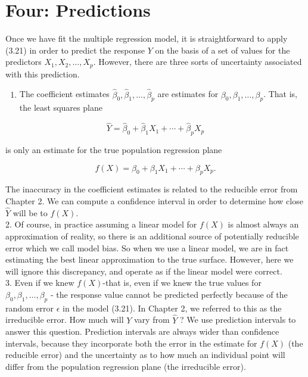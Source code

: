 \documentclass[10pt]{article}
\begin{document}
\section*{Four: Predictions}
Once we have fit the multiple regression model, it is straightforward to apply (3.21) in order to predict the response $Y$ on the basis of a set of values for the predictors $X_{1}, X_{2}, \ldots, X_{p}$. However, there are three sorts of uncertainty associated with this prediction.

\begin{enumerate}
  \item The coefficient estimates $\hat{\beta}_{0}, \hat{\beta}_{1}, \ldots, \hat{\beta}_{p}$ are estimates for $\beta_{0}, \beta_{1}, \ldots, \beta_{p}$. That is, the least squares plane
\end{enumerate}

$$
\hat{Y}=\hat{\beta}_{0}+\hat{\beta}_{1} X_{1}+\cdots+\hat{\beta}_{p} X_{p}
$$

is only an estimate for the true population regression plane

$$
f(X)=\beta_{0}+\beta_{1} X_{1}+\cdots+\beta_{p} X_{p} .
$$

The inaccuracy in the coefficient estimates is related to the reducible error from Chapter 2. We can compute a confidence interval in order to determine how close $\hat{Y}$ will be to $f(X)$.\\
2. Of course, in practice assuming a linear model for $f(X)$ is almost always an approximation of reality, so there is an additional source of potentially reducible error which we call model bias. So when we use a linear model, we are in fact estimating the best linear approximation to the true surface. However, here we will ignore this discrepancy, and operate as if the linear model were correct.\\
3. Even if we knew $f(X)$-that is, even if we knew the true values for $\beta_{0}, \beta_{1}, \ldots, \beta_{p}$ - the response value cannot be predicted perfectly because of the random error $\epsilon$ in the model (3.21). In Chapter 2, we referred to this as the irreducible error. How much will $Y$ vary from $\hat{Y}$ ? We use prediction intervals to answer this question. Prediction intervals are always wider than confidence intervals, because they incorporate both the error in the estimate for $f(X)$ (the reducible error) and the uncertainty as to how much an individual point will differ from the population regression plane (the irreducible error).
\end{document}
